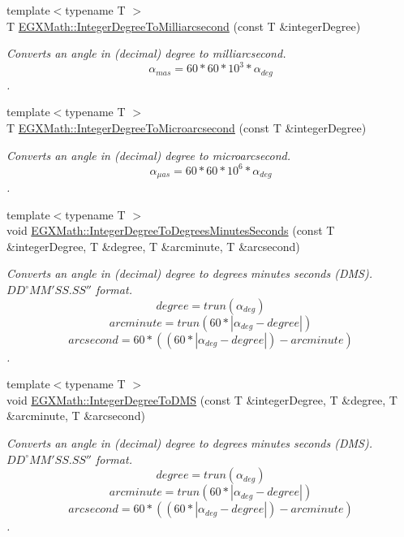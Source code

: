 \begin{DoxyCompactItemize}
{\footnotesize template$<$typename T $>$ }\\T \mbox{\hyperlink{group___e_g_x_math-_angle_conversions-_integer_degree_gadc43f22e832cd8fcf16b7bd2269ae348}{E\+G\+X\+Math\+::\+Integer\+Degree\+To\+Milliarcsecond}} (const T \&integer\+Degree)
\begin{DoxyCompactList}\small\item\em Converts an angle in (decimal) degree to milliarcsecond. \[\alpha_{mas}=60 * 60 * 10^3 * \alpha_{deg} \]. \end{DoxyCompactList}\item 
{\footnotesize template$<$typename T $>$ }\\T \mbox{\hyperlink{group___e_g_x_math-_angle_conversions-_integer_degree_ga69179d6082764595c7014805e1f6b31e}{E\+G\+X\+Math\+::\+Integer\+Degree\+To\+Microarcsecond}} (const T \&integer\+Degree)
\begin{DoxyCompactList}\small\item\em Converts an angle in (decimal) degree to microarcsecond. \[\alpha_{\mu as}=60 * 60 * 10^6 * \alpha_{deg}\]. \end{DoxyCompactList}\item 
{\footnotesize template$<$typename T $>$ }\\void \mbox{\hyperlink{group___e_g_x_math-_angle_conversions-_integer_degree_ga204317877546ea6bbafe5ff558f55a16}{E\+G\+X\+Math\+::\+Integer\+Degree\+To\+Degrees\+Minutes\+Seconds}} (const T \&integer\+Degree, T \&degree, T \&arcminute, T \&arcsecond)
\begin{DoxyCompactList}\small\item\em Converts an angle in (decimal) degree to degrees minutes seconds (D\+MS). ${DD}^{\circ}{MM}'{SS.SS}''$ format. \[degree=trun(\alpha_{deg})\] \[arcminute=trun(60 * |\alpha_{deg} - degree|)\] \[arcsecond=60 * ((60 * |\alpha_{deg} - degree|)-arcminute)\]. \end{DoxyCompactList}\item 
{\footnotesize template$<$typename T $>$ }\\void \mbox{\hyperlink{group___e_g_x_math-_angle_conversions-_integer_degree_gaf76779bcc23268b41d4c3a7610d60eaf}{E\+G\+X\+Math\+::\+Integer\+Degree\+To\+D\+MS}} (const T \&integer\+Degree, T \&degree, T \&arcminute, T \&arcsecond)
\begin{DoxyCompactList}\small\item\em Converts an angle in (decimal) degree to degrees minutes seconds (D\+MS). ${DD}^{\circ}{MM}'{SS.SS}''$ format. \[degree=trun(\alpha_{deg})\] \[arcminute=trun(60 * |\alpha_{deg} - degree|)\] \[arcsecond=60 * ((60 * |\alpha_{deg} - degree|)-arcminute)\]. \end{DoxyCompactList}\item 

\end{DoxyCompactItemize}
